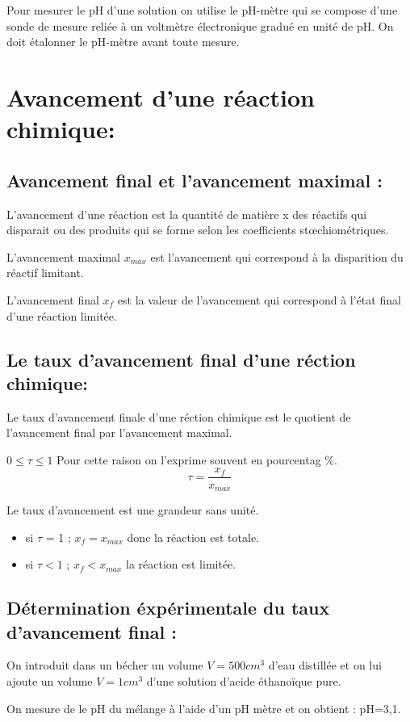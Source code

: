\documentclass[12pt]{article}
\begin{document}
Pour mesurer le pH d'une solution on utilise le pH-mètre qui se compose d'une sonde de mesure reliée à un voltmètre
électronique gradué en unité de pH. On doit étalonner le pH-mètre avant toute mesure.

\section{Avancement d'une réaction chimique:  }
\subsection{Avancement final et l'avancement maximal : }
L'avancement d'une réaction est la quantité de matière x des réactifs qui disparait ou des produits qui se forme selon
les coefficients stœchiométriques.

L'avancement maximal $x_{max}$ est l'avancement qui correspond à la disparition du réactif limitant.

L'avancement final $x_f$ est la valeur de l'avancement qui correspond à l'état final d'une réaction limitée.

\subsection{ Le taux d'avancement final d'une réction chimique:}
Le taux d'avancement finale d'une réction chimique est le quotient de l'avancement final par l'avancement maximal. 

$0 \leq \tau \leq 1$ Pour cette raison on l'exprime souvent en pourcentag \%.
$$\tau = \frac{x_f}{x_{max}}$$ 

Le taux d'avancement est une grandeur sans unité.

\begin{itemize}
	\item si $\tau$ = 1 ; $x_f = x_{max}$ donc la réaction est totale.
	\item si $\tau < 1$ ; $x_f < x_{max}$ la réaction est limitée.
\end{itemize}
\subsection{Détermination éxpérimentale du taux d'avancement final :}
On introduit dans un bécher un volume $V=500cm^3$ d'eau distillée et on lui ajoute un volume $V=1cm^3$ d'une solution d'acide éthanoïque pure.

On mesure de le pH du mélange à l'aide d'un pH mètre et on obtient : pH=3,1.
\end{document}
